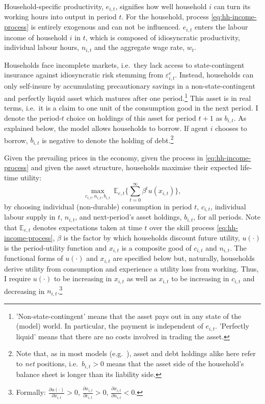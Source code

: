 \documentclass[a4paper,12pt]{article} %
\numberwithin{equation}{section} %
\numberwithin{figure}{section}
\numberwithin{table}{section}
\begin{document}
Household-specific productivity, $e_{i,t}$, signifies how well household $i$ can turn its working hours into output in period $t$. For the household, process \eqref{eq:hh-income-process} is entirely exogenous and can not be influenced. $e_{i,t}$ enters the labour income of household $i$ in $t$, which is composed of idiosyncratic productivity, individual labour hours, $n_{i,t}$ and the aggregate wage rate, $w_t$.

Households face incomplete markets, i.e.~they lack access to state-contingent insurance against idiosyncratic risk stemming from $\varepsilon^e_{i,t}$. Instead, households can only self-insure by accumulating precautionary savings in a non-state-contingent and perfectly liquid asset which matures after one period.\footnote{'Non-state-contingent' means that the asset pays out in any state of the (model) world. In particular, the payment is independent of $e_{i,t}$. 'Perfectly liquid' means that there are no costs involved in trading the asset.} This asset is in real terms, i.e.~it is a claim to one unit of the consumption good in the next period. I denote the period-$t$ choice on holdings of this asset for period $t+1$ as $b_{i,t}$. As explained below, the model allows households to borrow. If agent $i$ chooses to borrow, $b_{i,t}$ is negative to denote the holding of debt.\footnote{Note that, as in most models (e.g.~\cite{kaplan2018}), asset and debt holdings alike here refer to \textit{net} positions, i.e.~$b_{i,t} > 0$ means that the asset side of the household's balance sheet is longer than its liability side.}

Given the prevailing prices in the economy, given the process in \eqref{eq:hh-income-process} and given the asset structure, households maximise their expected life-time utility:
\begin{equation}
    \max_{c_{i,t}, n_{i,t}, b_{i,t}} \ \mathbb{E}_{e,t} \Bigg\{ \sum_{t=0}^{\infty} \beta^t u(x_{i,t}) \Bigg\}, \label{eq:hh-objective}
\end{equation}
by choosing individual (non-durable) consumption in period $t$, $c_{i,t}$, individual labour supply in $t$, $n_{i,t}$, and next-period's asset holdings, $b_{i,t}$, for all periods. Note that $\mathbb{E}_{e,t}$ denotes expectations taken at time $t$ over the skill process \eqref{eq:hh-income-process}, $\beta$ is the factor by which households discount future utility, $u( \cdot )$ is the period-utility function and $x_{i,t}$ is a composite good of $c_{i,t}$ and $n_{i,t}$. The functional forms of $u( \cdot )$ and $x_{i,t}$ are specified below but, naturally, households derive utility from consumption and experience a utility loss from working. Thus, I require $u( \cdot )$ to be increasing in $x_{i,t}$ as well as $x_{i,t}$ to be increasing in $c_{i,t}$ and decreasing in $n_{i,t}$.\footnote{Formally: $\frac{\partial u( \cdot )}{\partial x_{i,t}} > 0$, $\frac{\partial x_{i,t}}{\partial c_{i,t}} > 0$, $\frac{\partial x_{i,t}}{\partial n_{i,t}} < 0$.}
\end{document}

